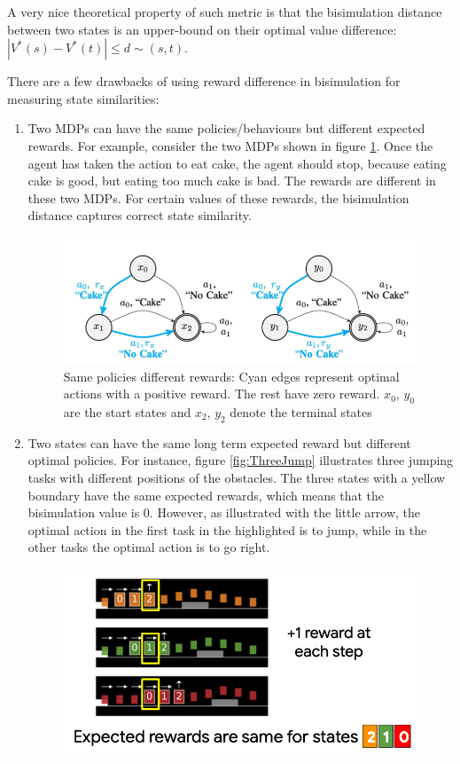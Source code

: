 \documentclass{usiinftr}
\begin{document}
A very nice theoretical property of such metric is that the bisimulation distance between two states is an upper-bound on their optimal value difference: $|V^*(s) - V^*(t)| \leq d \sim (s,t)$. \cite{castro2020scalable}

There are a few drawbacks of using reward difference in bisimulation for measuring state similarities:

\begin{enumerate}
    \item Two MDPs can have the same policies/behaviours but different expected rewards. For example, consider the two MDPs shown in figure \ref{fig:TwoMDP}. Once the agent has taken the action to eat cake, the agent should stop, because eating cake is good, but eating too much cake is bad. The rewards are different in these two MDPs. For certain values of these rewards, the bisimulation distance captures correct state similarity. \cite{slidelive}
\begin{figure}[h]
    \centering
    \includegraphics[width = 0.6\linewidth]{figures/image7.png}
    \caption{Same policies different rewards: Cyan edges represent optimal actions with a positive reward. The rest have zero reward. $x_0$, $y_0$ are the start states and $x_2$, $y_2$ denote the terminal states \cite{agarwal2021contrastive}}
    \label{fig:TwoMDP}
\end{figure}
    \item Two states can have the same long term expected reward but different optimal policies. For instance,  figure \ref{fig:ThreeJump} illustrates three jumping tasks with different positions of the obstacles. The three states with a yellow boundary have the same expected rewards, which means that the bisimulation value is 0. However, as illustrated with the little arrow, the optimal action in the first task in the highlighted is to jump, while in the other tasks the optimal action is to go right. 
\cite{slidelive}
\begin{figure}[h]
    \centering
    \includegraphics[width = 0.55\linewidth]{figures/image8.png}

\end{figure}
\end{enumerate}
\end{document}
